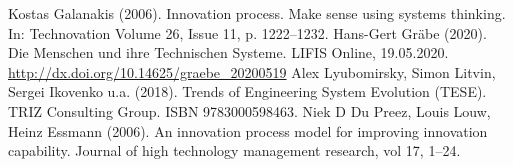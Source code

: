 \documentclass[11pt,a4paper]{article}
\begin{document}
\begin{thebibliography}{xxx}
 Kostas Galanakis (2006).  Innovation process. Make
  sense using systems thinking.  In: Technovation Volume 26, Issue 11,
  p. 1222--1232.
 Hans-Gert Gräbe (2020). Die Menschen und ihre Technischen
  Systeme. LIFIS Online, 19.05.2020.
  \url{http://dx.doi.org/10.14625/graebe_20200519}
 Alex Lyubomirsky, Simon Litvin, Sergei Ikovenko u.a.
  (2018).  Trends of Engineering System Evolution (TESE).  TRIZ Consulting
  Group. ISBN 9783000598463.
 Niek D Du Preez, Louis Louw, Heinz Essmann (2006). An
  innovation process model for improving innovation capability.  Journal of
  high technology management research, vol 17, 1--24.
\end{thebibliography}
\end{document}
